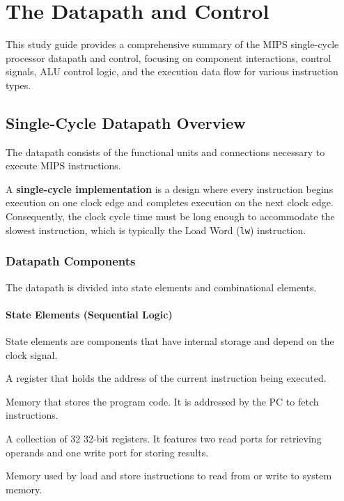 \chapter{The Datapath and Control}

This study guide provides a comprehensive summary of the MIPS single-cycle processor datapath and control, focusing on component interactions, control signals, ALU control logic, and the execution data flow for various instruction types.

\section{Single-Cycle Datapath Overview}

The datapath consists of the functional units and connections necessary to execute MIPS instructions.

\begin{definition}
A \textbf{single-cycle implementation} is a design where every instruction begins execution on one clock edge and completes execution on the next clock edge. Consequently, the clock cycle time must be long enough to accommodate the slowest instruction, which is typically the Load Word (\texttt{lw}) instruction.
\end{definition}

\subsection{Datapath Components}

The datapath is divided into state elements and combinational elements.

\subsubsection{State Elements (Sequential Logic)}
State elements are components that have internal storage and depend on the clock signal.

\begin{vocabulary}
A register that holds the address of the current instruction being executed.
\end{vocabulary}
\vspace{-10pt}
\begin{vocabulary}
Memory that stores the program code. It is addressed by the PC to fetch instructions.
\end{vocabulary}
\vspace{-10pt}
\begin{vocabulary}
A collection of 32 32-bit registers. It features two read ports for retrieving operands and one write port for storing results.
\end{vocabulary}
\vspace{-10pt}
\begin{vocabulary}
Memory used by load and store instructions to read from or write to system memory.
\end{vocabulary}

